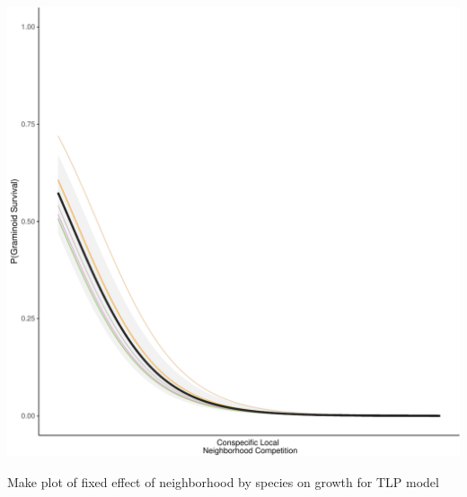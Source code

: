 \documentclass[
]{article}
\begin{document}
\includegraphics{figures/unnamed-chunk-8-1.pdf}

Make plot of fixed effect of neighborhood by species on growth for TLP
model
\end{document}
